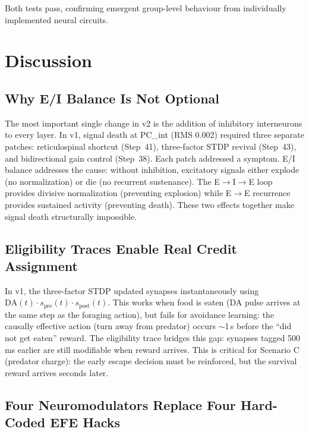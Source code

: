 \documentclass[11pt,a4paper]{article}
\begin{document}
Both tests pass, confirming emergent group-level behaviour from
individually implemented neural circuits.

\section{Discussion}\label{sec:discussion}

\subsection{Why E/I Balance Is Not Optional}

The most important single change in v2 is the addition of inhibitory
interneurons to every layer.
In v1, signal death at PC\_int (RMS 0.002) required three separate patches:
reticulospinal shortcut (Step~41), three-factor STDP revival (Step~43),
and bidirectional gain control (Step~38).
Each patch addressed a symptom.
E/I balance addresses the cause: without inhibition, excitatory signals
either explode (no normalization) or die (no recurrent sustenance).
The E$\to$I$\to$E loop provides divisive normalization (preventing explosion)
while E$\to$E recurrence provides sustained activity (preventing death).
These two effects together make signal death structurally impossible.

\subsection{Eligibility Traces Enable Real Credit Assignment}

In v1, the three-factor STDP updated synapses instantaneously using
$\text{DA}(t) \cdot s_\text{pre}(t) \cdot s_\text{post}(t)$.
This works when food is eaten (DA pulse arrives at the same step as the
foraging action), but fails for avoidance learning: the causally effective
action (turn away from predator) occurs $\sim$1\,s before the
``did not get eaten'' reward.
The eligibility trace bridges this gap: synapses tagged 500\,ms earlier
are still modifiable when reward arrives.
This is critical for Scenario C (predator charge): the early escape
decision must be reinforced, but the survival reward arrives seconds later.

\subsection{Four Neuromodulators Replace Four Hard-Coded EFE Hacks}
\end{document}
